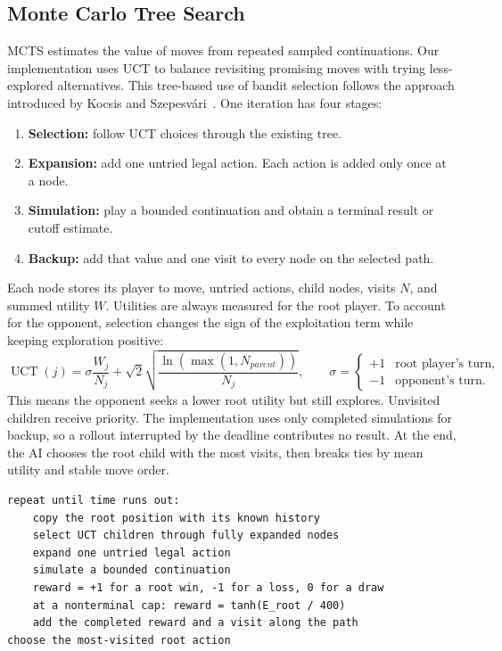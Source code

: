 \documentclass[oneside,final]{hcmut-report}
\begin{document}
\subsection{Monte Carlo Tree Search}
MCTS estimates the value of moves from repeated sampled continuations.
Our implementation uses UCT to balance revisiting promising moves with trying
less-explored alternatives. This tree-based use of bandit selection follows
the approach introduced by Kocsis and Szepesv\'ari~\cite{uct}. One iteration
has four stages:
\begin{enumerate}
\item \textbf{Selection:} follow UCT choices through the existing tree.
\item \textbf{Expansion:} add one untried legal action. Each action is added only once at a node.
\item \textbf{Simulation:} play a bounded continuation and obtain a terminal result or cutoff estimate.
\item \textbf{Backup:} add that value and one visit to every node on the selected path.
\end{enumerate}

Each node stores its player to move, untried actions, child nodes, visits $N$,
and summed utility $W$. Utilities are always measured for the root player.
To account for the opponent, selection changes the sign of the exploitation
term while keeping exploration positive:
\[
 \operatorname{UCT}(j)=\sigma\frac{W_j}{N_j}
 +\sqrt{2}\sqrt{\frac{\ln(\max(1,N_{parent}))}{N_j}},\qquad
 \sigma=\begin{cases}+1&\text{root player's turn},\\-1&\text{opponent's turn}.\end{cases}
\]
This means the opponent seeks a lower root utility but still explores.
Unvisited children receive priority. The implementation uses only completed
simulations for backup, so a rollout interrupted by the deadline contributes
no result. At the end, the AI chooses the root child with the most visits,
then breaks ties by mean utility and stable move order.
\begin{lstlisting}[caption={One MCTS search under a time budget.}]
repeat until time runs out:
    copy the root position with its known history
    select UCT children through fully expanded nodes
    expand one untried legal action
    simulate a bounded continuation
    reward = +1 for a root win, -1 for a loss, 0 for a draw
    at a nonterminal cap: reward = tanh(E_root / 400)
    add the completed reward and a visit along the path
choose the most-visited root action
\end{lstlisting}
\end{document}
